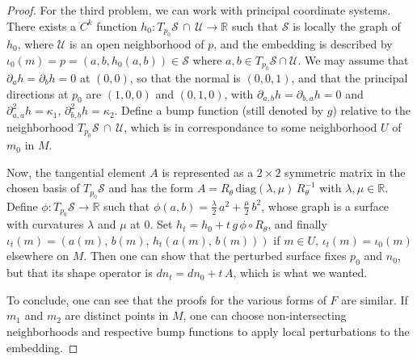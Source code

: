 \documentclass[11pt]{article}
\newcommand{\R}{\mathbb{R}}
\newcommand{\io}{\iota}
\newcommand{\kap}{\kappa}
\newcommand{\inter}{\cap}
\newcommand{\Surf}{\mathcal{S}}
\theoremstyle{plain}
\theoremstyle{definition}
\theoremstyle{remark}
\begin{document}
\begin{proof}
For the third problem, we can work with principal coordinate systems. There exists a $C^k$ function $h_0 : T_{p_0} \Surf \, \inter \, \mathcal{U} \to \R$ such that $\Surf$ is locally the graph of $h_0$, where $\mathcal{U}$ is an open neighborhood of $p$, and the embedding is described by $\io_0(m) = p = (a,b,h_0(a,b)) \in \Surf$ where $a,b \in T_{p_0} \Surf \inter \mathcal{U}$. We may assume that $\partial_a h = \partial_b h = 0$ at $(0,0)$, so that the normal is $(0,0,1)$, and that the principal directions at $p_0$ are $(1,0,0)$ and $(0,1,0)$, with $\partial_{a,b} h = \partial_{b,a} h = 0$ and $\partial^2_{a,a} h = \kap_1$, $\partial^2_{b,b} h = \kap_2$. Define a bump function (still denoted by $g$) relative to the neighborhood $T_{p_0} \Surf \, \inter \, \mathcal{U}$, which is in correspondance to some neighborhood $U$ of $m_0$ in $M$.

Now, the tangential element $A$ is represented as a $2 \times 2$ symmetric matrix in the chosen basis of $T_{p_0} \Surf$ and has the form $A = R_\theta \, \mathrm{diag}(\lambda, \mu) \, R_\theta^{-1}$ with $\lambda, \mu \in \R$. Define $\phi : T_{p_0} \Surf \to \R$ such that $\phi(a,b) = \frac{\lambda}{2} \, a^2 + \frac{\mu}{2} \, b^2$, whose graph is a surface with curvatures $\lambda$ and $\mu$ at $0$. Set $h_t = h_0 + t\, g \, \phi \circ R_\theta$, and finally $\io_t(m) = (a(m),\, b(m),\, h_t(a(m),\, b(m)))$ if $m \in U$, $\io_t(m) = \io_0(m)$ elsewhere on $M$. Then one can show that the perturbed surface fixes $p_0$ and $n_0$, but that its shape operator is $dn_t = dn_0 + t \, A$, which is what we wanted.

To conclude, one can see that the proofs for the various forms of $F$ are similar. If $m_1$ and $m_2$ are distinct points in $M$, one can choose non-intersecting neighborhoods and respective bump functions to apply local perturbations to the embedding.
\end{proof}
\end{document}
